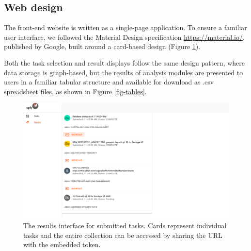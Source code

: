 \documentclass{article}
\begin{document}
\subsection{Web design}

The front-end website is written as a single-page application.
To ensure a familiar user interface, we followed the Material Design specification \url{https://material.io/}, published by Google, built around a card-based design (Figure \ref{fig-results}).

Both the task selection and result displays follow the same design pattern, where data storage is graph-based, but the results of analysis modules are presented to users in a familiar tabular structure and available for download as .csv spreadsheet files, as shown in Figure \ref{fig-tables}.

\begin{figure}[!hb]
\begin{center}
\includegraphics[width=\textwidth]{images/results.png}
\end{center}
\caption{The results interface for submitted tasks. Cards represent individual tasks and the entire collection can be accessed by sharing the URL with the embedded token.}
\label{fig-results}
\end{figure}
\end{document}
